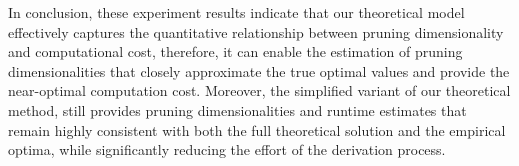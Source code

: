 In conclusion, these experiment results indicate that our theoretical model effectively captures the quantitative relationship between pruning dimensionality and computational cost, therefore, it can enable the estimation of pruning dimensionalities that closely approximate the true optimal values and provide the near-optimal computation cost. Moreover, the simplified variant of our theoretical method, still provides pruning dimensionalities and runtime estimates that remain highly consistent with both the full theoretical solution and the empirical optima, while significantly reducing the effort of the derivation process.

